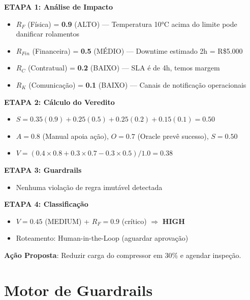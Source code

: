 \documentclass[12pt, a4paper]{article}
\begin{document}
\begin{tcolorbox}[colback=blue!5, colframe=blue!50, title=Raciocínio do CAOS (Vertex AI)]
\small

\textbf{ETAPA 1: Análise de Impacto}
\begin{itemize}
    \item $R_F$ (Física) = \textbf{0.9} (ALTO) — Temperatura 10°C acima do limite pode danificar rolamentos
    \item $R_{Fin}$ (Financeira) = \textbf{0.5} (MÉDIO) — Downtime estimado 2h = R\$5.000
    \item $R_C$ (Contratual) = \textbf{0.2} (BAIXO) — SLA é de 4h, temos margem
    \item $R_K$ (Comunicação) = \textbf{0.1} (BAIXO) — Canais de notificação operacionais
\end{itemize}

\textbf{ETAPA 2: Cálculo do Veredito}
\begin{itemize}
    \item $S = 0.35(0.9) + 0.25(0.5) + 0.25(0.2) + 0.15(0.1) = 0.50$
    \item $A = 0.8$ (Manual apoia ação), $O = 0.7$ (Oracle prevê sucesso), $S = 0.50$
    \item $V = (0.4 \times 0.8 + 0.3 \times 0.7 - 0.3 \times 0.5) / 1.0 = 0.38$
\end{itemize}

\textbf{ETAPA 3: Guardrails}
\begin{itemize}
    \item Nenhuma violação de regra imutável detectada
\end{itemize}

\textbf{ETAPA 4: Classificação}
\begin{itemize}
    \item $V = 0.45$ (MEDIUM) + $R_F = 0.9$ (crítico) $\Rightarrow$ \textbf{HIGH}
    \item Roteamento: Human-in-the-Loop (aguardar aprovação)
\end{itemize}

\textbf{Ação Proposta}: Reduzir carga do compressor em 30\% e agendar inspeção.
\end{tcolorbox}

\newpage

\section{Motor de Guardrails}
\label{sec:guardrails}
\end{document}
